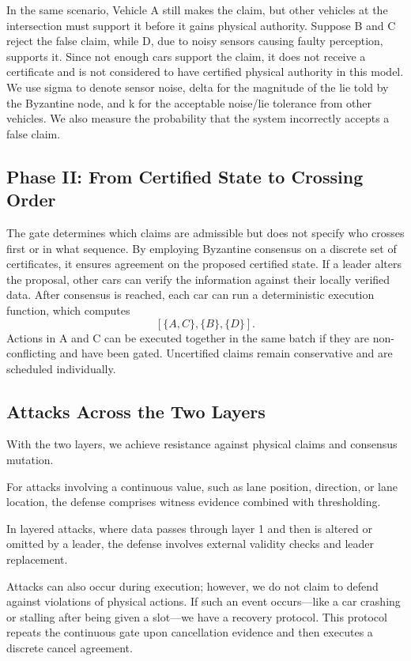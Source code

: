 \documentclass[letterpaper,10pt,conference]{IEEEtran}
\begin{document}
In the same scenario, Vehicle A still makes the claim, but other vehicles at the intersection must support it before it gains physical authority. Suppose B and C reject the false claim, while D, due to noisy sensors causing faulty perception, supports it. Since not enough cars support the claim, it does not receive a certificate and is not considered to have certified physical authority in this model. We use sigma to denote sensor noise, delta for the magnitude of the lie told by the Byzantine node, and k for the acceptable noise/lie tolerance from other vehicles. We also measure the probability that the system incorrectly accepts a false claim.





\subsection{Phase II: From Certified State to Crossing Order}


The gate determines which claims are admissible but does not specify who crosses first or in what sequence. By employing Byzantine consensus on a discrete set of certificates, it ensures agreement on the proposed certified state. If a leader alters the proposal, other cars can verify the information against their locally verified data. After consensus is reached, each car can run a deterministic execution function, which computes 
\[
[ \{A,C\}, \{B\}, \{D\} ].
\]
Actions in A and C can be executed together in the same batch if they are non-conflicting and have been gated. Uncertified claims remain conservative and are scheduled individually.

\subsection{Attacks Across the Two Layers}

With the two layers, we achieve resistance against physical claims and consensus mutation.

For attacks involving a continuous value, such as lane position, direction, or lane location, the defense comprises witness evidence combined with thresholding.

In layered attacks, where data passes through layer 1 and then is altered or omitted by a leader, the defense involves external validity checks and leader replacement.

Attacks can also occur during execution; however, we do not claim to defend against violations of physical actions. If such an event occurs—like a car crashing or stalling after being given a slot—we have a recovery protocol. This protocol repeats the continuous gate upon cancellation evidence and then executes a discrete cancel agreement.
\end{document}
